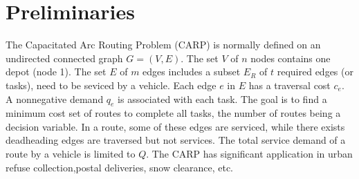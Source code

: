 \documentclass[conference,compsoc]{IEEEtran}
\begin{document}






%
\IEEEpeerreviewmaketitle



\section{Preliminaries}
The Capacitated Arc Routing Problem (CARP) is normally defined on an undirected connected graph $G = (V, E)$. The set $V$ of $n$ nodes contains one depot (node 1). The set $E$ of $m$ edges includes a subset $E_R$ of $t$ required edges (or tasks), need to be seviced by a vehicle. Each edge $e$ in $E$ has a traversal cost $c_e$. A nonnegative demand $q_e$ is associated with each task. The goal is to find a minimum cost set of routes to complete all tasks, the number of routes being a decision variable. In a route, some of these edges are serviced, while there exists deadheading edges are traversed but not services. The total service demand of a route by a vehicle is limited to $Q$.\cite{Eiselt} The CARP has significant application in urban refuse collection,postal deliveries, snow clearance, etc.\cite{Brandao} 





%
%
\end{document}
